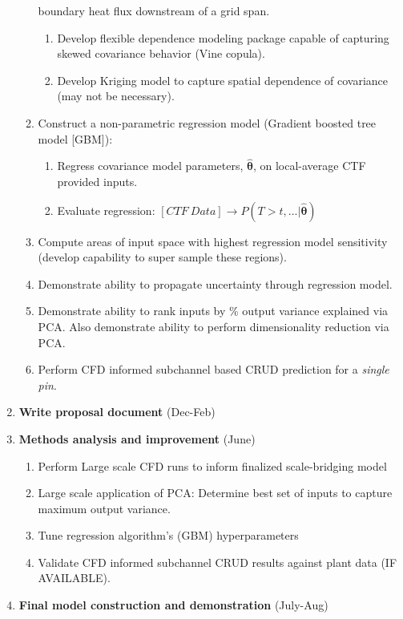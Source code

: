 \documentclass[10pt,a4paper]{report}
\begin{document}
\begin{enumerate}
\begin{enumerate}
              boundary heat flux downstream of a grid span.
        \begin{enumerate}
            \item Develop flexible dependence modeling package capable of capturing skewed covariance behavior (Vine copula).
            \item Develop Kriging model to capture spatial dependence of covariance (may not be necessary).
        \end{enumerate}
        \item Construct a non-parametric regression model (Gradient boosted tree model [GBM]):
        \begin{enumerate}
            \item Regress covariance model parameters, $\bm{\hat\theta}$, on local-average CTF provided inputs.
            \item Evaluate regression: $[CTF\ Data] \rightarrow {P(T>t,...|\bm{\hat\theta})}$
        \end{enumerate}
        \item Compute areas of input space with highest regression model sensitivity (develop capability to super sample these regions).
        \item Demonstrate ability to propagate uncertainty through regression model.
        \item Demonstrate ability to rank inputs by \% output variance explained via PCA.  Also demonstrate ability to
              perform dimensionality reduction via PCA.
          \item Perform CFD informed subchannel based CRUD prediction for a \emph{single pin}.
    \end{enumerate}
\item \textbf{Write proposal document} (Dec-Feb)
\item \textbf{Methods analysis and improvement} (June)
    \begin{enumerate}
        \item Perform Large scale CFD runs to inform finalized scale-bridging model
        \item Large scale application of PCA: Determine best set of inputs to capture maximum output variance.
        \item Tune regression algorithm's (GBM) hyperparameters
        \item Validate CFD informed subchannel CRUD results against plant data (IF AVAILABLE).
    \end{enumerate}
\item \textbf{Final model construction and demonstration} (July-Aug)

\end{enumerate}
\end{document}
